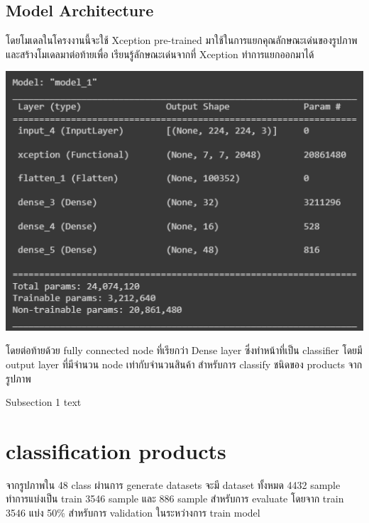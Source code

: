 \subsection{Model Architecture}
โดยโมเดลในโครงงานนี้จะใช้ Xception pre-trained มาใช้ในการแยกคุณลักษณะเด่นของรูปภาพ  และสร้างโมเดลมาต่อท้ายเพื่อ 
เรียนรู้ลักษณะเด่นจากที่ Xception ทำการแยกออกมาได้
\begin{center}
  \includegraphics[scale=0.45]{pic/model.png}
\end{center}
  
โดยต่อท้ายด้วย fully connected node ที่เรียกว่า Dense layer ซึ่งทำหน้าที่เป็น classifier 
 โดยมี output layer ที่มีจำนวน node เท่ากับจำนวนสินค้า สำหรับการ classify ชนิดของ
  products จาก รูปภาพ
 

 

 

Subsection 1 text

\section{classification products}
จากรูปภาพใน 48 class ผ่านการ generate datasets จะมี dataset ทั้งหมด 4432 sample
 ทำการแบ่งเป็น train 3546 sample และ  886 sample สำหรับการ evaluate 
โดยจาก train 3546 แบ่ง 50\% สำหรับการ validation ในระหว่างการ train model


